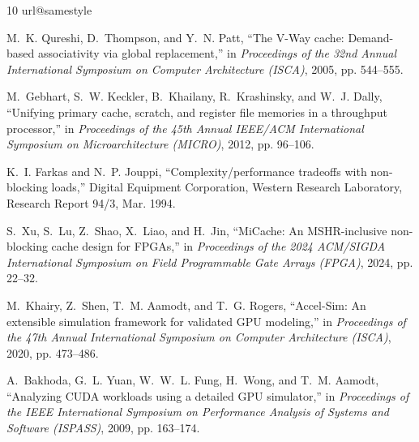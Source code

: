\documentclass[conference,letterpaper]{IEEEtran}
\begin{document}
\clearpage
\begin{thebibliography}{10}
\providecommand{\url}[1]{#1}
\csname url@samestyle\endcsname
\providecommand{\newblock}{\relax}
\providecommand{\bibinfo}[2]{#2}
\providecommand{\BIBentrySTDinterwordspacing}{\spaceskip=0pt\relax}
\providecommand{\BIBentryALTinterwordstretchfactor}{4}
\providecommand{\BIBentryALTinterwordspacing}{\spaceskip=\fontdimen2\font plus
\BIBentryALTinterwordstretchfactor\fontdimen3\font minus
  \fontdimen4\font\relax}
\providecommand{\BIBforeignlanguage}[2]{{%
\expandafter\ifx\csname l@#1\endcsname\relax
\typeout{** WARNING: IEEEtran.bst: No hyphenation pattern has been}%
\typeout{** loaded for the language `#1'. Using the pattern for}%
\typeout{** the default language instead.}%
\else
\language=\csname l@#1\endcsname
\fi
#2}}
\providecommand{\BIBdecl}{\relax}
\BIBdecl

M.~K. Qureshi, D.~Thompson, and Y.~N. Patt, ``The {V-Way} cache: Demand-based
  associativity via global replacement,'' in \emph{Proceedings of the 32nd
  Annual International Symposium on Computer Architecture (ISCA)}, 2005, pp.
  544--555.

M.~Gebhart, S.~W. Keckler, B.~Khailany, R.~Krashinsky, and W.~J. Dally,
  ``Unifying primary cache, scratch, and register file memories in a throughput
  processor,'' in \emph{Proceedings of the 45th Annual IEEE/ACM International
  Symposium on Microarchitecture (MICRO)}, 2012, pp. 96--106.

K.~I. Farkas and N.~P. Jouppi, ``Complexity/performance tradeoffs with
  non-blocking loads,'' Digital Equipment Corporation, Western Research
  Laboratory, Research Report 94/3, Mar. 1994.

S.~Xu, S.~Lu, Z.~Shao, X.~Liao, and H.~Jin, ``{MiCache}: An {MSHR}-inclusive
  non-blocking cache design for {FPGAs},'' in \emph{Proceedings of the 2024
  ACM/SIGDA International Symposium on Field Programmable Gate Arrays (FPGA)},
  2024, pp. 22--32.

M.~Khairy, Z.~Shen, T.~M. Aamodt, and T.~G. Rogers, ``{Accel-Sim}: An
  extensible simulation framework for validated {GPU} modeling,'' in
  \emph{Proceedings of the 47th Annual International Symposium on Computer
  Architecture (ISCA)}, 2020, pp. 473--486.

A.~Bakhoda, G.~L. Yuan, W.~W.~L. Fung, H.~Wong, and T.~M. Aamodt, ``Analyzing
  {CUDA} workloads using a detailed {GPU} simulator,'' in \emph{Proceedings of
  the IEEE International Symposium on Performance Analysis of Systems and
  Software (ISPASS)}, 2009, pp. 163--174.


\end{thebibliography}
\end{document}
